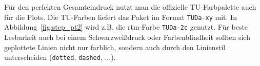 Für den perfekten Gesamteindruck nutzt man die offizielle TU-Farbpalette auch für die Plots.
Die TU-Farben liefert das Paket im Format \texttt{TUDa-xy} mit.
In Abbildung~\ref{fig:step_pt2} wird z.B. die rtm-Farbe \textcolor{TUDa-2c}{\texttt{TUDa-2c}} genutzt.
Für beste Lesbarkeit auch bei einem Schwarzweißdruck oder Farbenblindheit sollten sich geplottete Linien nicht nur farblich, sondern auch durch den Linienstil unterscheiden (\texttt{dotted}, \texttt{dashed}, ...).

